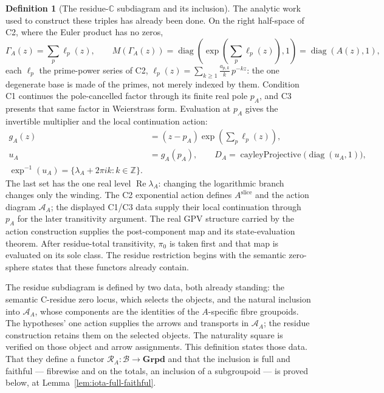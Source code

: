 \documentclass[11pt]{article}
\newcommand{\CC}{\mathbb{C}}
\newcommand{\ZZ}{\mathbb{Z}}
\theoremstyle{plain}
\theoremstyle{definition}
\newtheorem{definition}[theorem]{Definition}
\theoremstyle{remark}
\begin{document}
\begin{definition}[The residue-$\CC$ subdiagram and its inclusion]
The analytic work used to construct these triples has already been done.
On the right half-space of \textup{C2}, where the Euler product has no
zeros,
\[
 \Gamma_A(z)=\sum_p\ell_p(z),\qquad
 M(\Gamma_A(z))
 =\operatorname{diag}\!\left(\exp\!\left(\sum_p\ell_p(z)\right),1\right)
 =\operatorname{diag}(A(z),1),
                                                        \tag{E}\label{eq:residue-euler-matrix}
\]
each $\ell_p$ the prime-power series of \textup{C2},
$\ell_p(z)=\sum_{k\ge1}\tfrac{a_{p,k}}{k}\,p^{-kz}$: the one degenerate
base is made of the primes, not merely indexed by them.
Condition \textup{C1} continues the pole-cancelled factor through its finite
real pole $p_A$, and \textup{C3} presents that same factor in Weierstrass
form. Evaluation at $p_A$ gives the invertible multiplier and the local
continuation action:
\[
\begin{aligned}
 g_A(z)&=(z-p_A)\exp\!\left(\sum_p\ell_p(z)\right),\\
 u_A&=g_A(p_A),\qquad
 D_A=\operatorname{cayleyProjective}
       \bigl(\operatorname{diag}(u_A,1)\bigr),\\
 \exp^{-1}(u_A)=\{\lambda_A+2\pi ik:k\in\ZZ\}.
\end{aligned}                                         \tag{EW}\label{eq:residue-weierstrass-recap}
\]
The last set has the one real level $\operatorname{Re}\lambda_A$: changing
the logarithmic branch changes only the winding. The C2 exponential action
defines $A^{\mathrm{slice}}$ and the action diagram $\mathcal A_A$; the
displayed C1/C3 data supply their local continuation through $p_A$ for
the later transitivity argument. The real GPV structure carried by the
action construction supplies the post-component map and its
state-evaluation theorem.
After residue-total transitivity, $\pi_0$ is taken first and that map is
evaluated on its sole class. The residue restriction begins with the semantic
zero-sphere states that these functors already contain.

The residue subdiagram is defined by two data, both already standing: the
semantic C-residue zero locus, which selects the objects, and the natural
inclusion into $\mathcal A_A$, whose components are the identities of the
$A$-specific fibre groupoids.  The hypotheses' one action supplies the
arrows and transports in $\mathcal A_A$; the residue construction retains
them on the selected objects.  The naturality square is verified on those
object and arrow assignments.  This definition states those data.  That they define a functor
$\mathcal R_A:\mathcal B\to\mathbf{Grpd}$ and that the inclusion is full
and faithful --- fibrewise and on the totals, an inclusion of a subgroupoid
--- is proved below, at Lemma~\ref{lem:iota-full-faithful}.


\end{definition}
\end{document}
